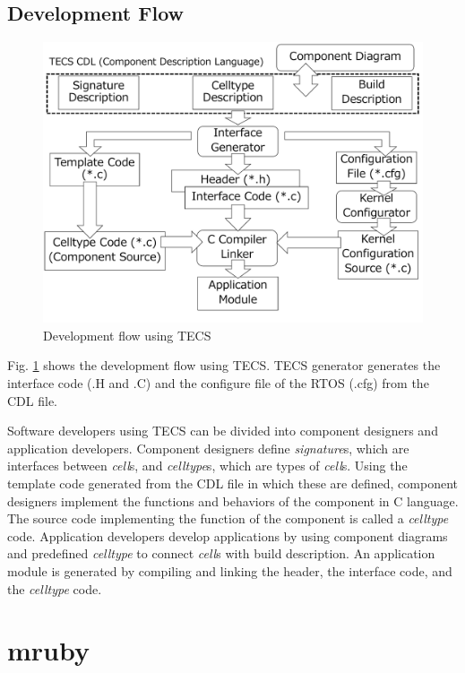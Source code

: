 \documentclass[a4j,12pt,oneside,openany,english]{jsbook}
\begin{document}
\subsection{Development Flow}

\begin{figure}[t]
    \centering
    \includegraphics[width=12cm,clip]{figure/TECSFlow.pdf}
    \caption{Development flow using TECS}
    \label{fig:TECSFlow}
\end{figure}

Fig. \ref{fig:TECSFlow} shows the development flow using TECS.
TECS generator generates the interface code (.H and .C) and the configure file of the RTOS (.cfg) from the CDL file.

Software developers using TECS can be divided into component designers and application developers.
Component designers define {\it signature}s, which are interfaces between {\it cell}s, and {\it celltype}s, which are types of {\it cell}s.
Using the template code generated from the CDL file in which these are defined, component designers implement the functions and behaviors of the component in C language.
The source code implementing the function of the component is called a {\it celltype} code.
Application developers develop applications by using component diagrams and predefined {\it celltype} to connect {\it cell}s with build description.
An application module is generated by compiling and linking the header, the interface code, and the {\it celltype} code.


\section{mruby}
\label{sec:mruby}
\end{document}
